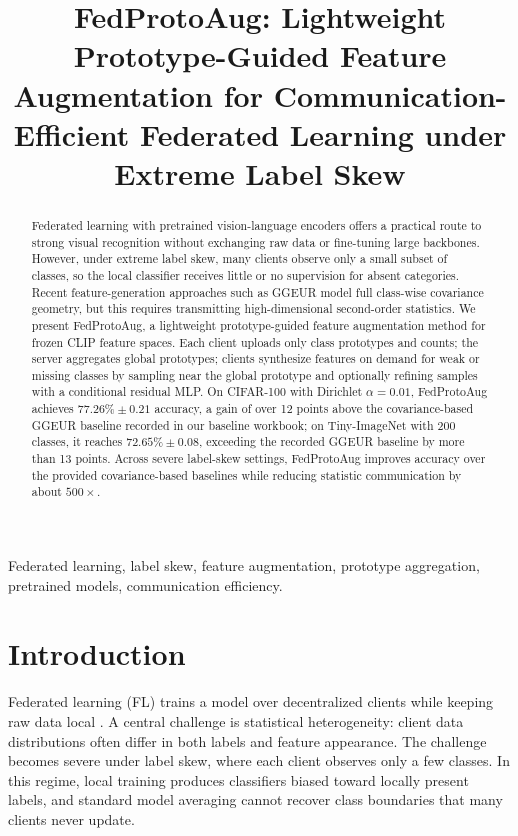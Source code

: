 ﻿\documentclass[conference]{IEEEtran}
\newcommand{\method}{FedProtoAug}
\newcommand{\clip}{CLIP}
\begin{document}
\title{\method: Lightweight Prototype-Guided Feature Augmentation for Communication-Efficient Federated Learning under Extreme Label Skew}

\author{
}

\maketitle

\begin{abstract}
Federated learning with pretrained vision-language encoders offers a practical route to strong visual recognition without exchanging raw data or fine-tuning large backbones. However, under extreme label skew, many clients observe only a small subset of classes, so the local classifier receives little or no supervision for absent categories. Recent feature-generation approaches such as GGEUR model full class-wise covariance geometry, but this requires transmitting high-dimensional second-order statistics. We present \method, a lightweight prototype-guided feature augmentation method for frozen \clip{} feature spaces. Each client uploads only class prototypes and counts; the server aggregates global prototypes; clients synthesize features on demand for weak or missing classes by sampling near the global prototype and optionally refining samples with a conditional residual MLP. On CIFAR-100 with Dirichlet $\alpha = 0.01$, \method{} achieves $77.26\%\pm0.21$ accuracy, a gain of over 12 points above the covariance-based GGEUR baseline recorded in our baseline workbook; on Tiny-ImageNet with 200 classes, it reaches $72.65\%\pm0.08$, exceeding the recorded GGEUR baseline by more than 13 points. Across severe label-skew settings, \method{} improves accuracy over the provided covariance-based baselines while reducing statistic communication by about $500\times$.
\end{abstract}

\begin{IEEEkeywords}
Federated learning, label skew, feature augmentation, prototype aggregation, pretrained models, communication efficiency.
\end{IEEEkeywords}

\section{Introduction}

Federated learning (FL) trains a model over decentralized clients while keeping raw data local \cite{mcmahan2017fedavg}. A central challenge is statistical heterogeneity: client data distributions often differ in both labels and feature appearance. The challenge becomes severe under label skew, where each client observes only a few classes. In this regime, local training produces classifiers biased toward locally present labels, and standard model averaging cannot recover class boundaries that many clients never update.
\end{document}
